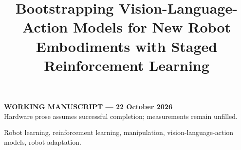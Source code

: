 \documentclass[letterpaper,journal]{IEEEtran}
\begin{document}
\title{Bootstrapping Vision-Language-Action Models for New Robot Embodiments with Staged Reinforcement Learning}
\author{\vspace{1em}}
\maketitle
\begin{center}\small\textbf{WORKING MANUSCRIPT --- 22 October 2026}\\
Hardware prose assumes successful completion; measurements remain unfilled.
\end{center}

\begin{IEEEkeywords}
Robot learning, reinforcement learning, manipulation, vision-language-action models, robot adaptation.
\end{IEEEkeywords}











\end{document}
